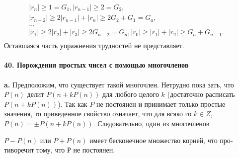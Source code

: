 		$$\begin{array}{ccccc}
				|r_n| \geqslant 1 = G_1, |r_{n-1}| \geqslant 2 = G_2,\\
				|r_{n-2}| \geqslant 2|r_{n-1}| + |r_n| \geqslant 2G_2 + G_1 = G_a,\\
				\ldots                                                                                        & \\
				|r_1| \geqslant 2|r_2|+ |r_3| \geqslant 2G_{n-2} = G_n, |r_0| \geqslant |r_1| + |r_2| \geqslant G_n + G_{n-1}.\\
		\end{array}$$
Оставшаяся часть упражнения трудностей не представляет.\\
\\
\noindent\textbf{40. Порождения простых чисел с помощью многочленов}\\
\\
\hspace*{15pt}\textbf{a.} Предположим, что существует такой многочлен. Нетрудно пока­\linebreak
зать, что $P(n)$ делит $P(n + kP(n))$ для любого целого $k$ (достаточно\linebreak
расписать $P(n + kP(n))$). Так как $P$ не постоянен и принимает только\linebreak
простые значения, то приведенное свойство означает, что для всяко­\linebreak
го $k \in Z$, $P(n) = \pm P(n + kP(n)).$  Следовательно, один из многочленов\linebreak

\pagebreak
\noindent$P - P(n)$ или $P + P(n)$ имеет бесконечное множество корней, что про­\linebreak
тиворечит тому, что Р не постоянен.

